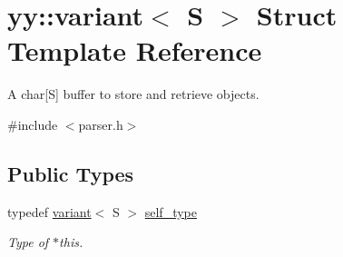 \hypertarget{structyy_1_1variant}{}\section{yy\+:\+:variant$<$ S $>$ Struct Template Reference}
\label{structyy_1_1variant}


A char\mbox{[}S\mbox{]} buffer to store and retrieve objects.  




{\ttfamily \#include $<$parser.\+h$>$}

\subsection*{Public Types}
\begin{DoxyCompactItemize}
\item 
\hypertarget{structyy_1_1variant_afbd75aee339bd9fa06e6fa8f320cecd3}{}typedef \hyperlink{structyy_1_1variant}{variant}$<$ S $>$ \hyperlink{structyy_1_1variant_afbd75aee339bd9fa06e6fa8f320cecd3}{self\+\_\+type}\label{structyy_1_1variant_afbd75aee339bd9fa06e6fa8f320cecd3}

\begin{DoxyCompactList}\small\item\em Type of $\ast$this. \end{DoxyCompactList}\end{DoxyCompactItemize}
